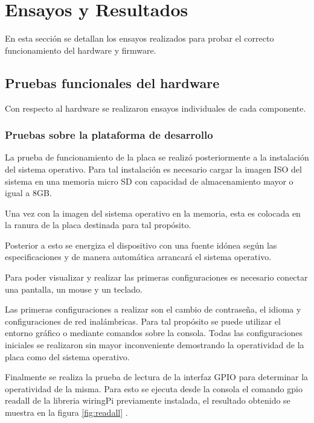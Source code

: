
\chapter{Ensayos y Resultados} %

\label{Chapter4} %
En esta sección se detallan los ensayos realizados para probar el correcto funcionamiento del hardware y firmware.

\section{Pruebas funcionales del hardware}
\label{sec:pruebasHW}

Con respecto al hardware se realizaron ensayos individuales de cada componente.
\subsection{Pruebas sobre la plataforma de desarrollo}
La prueba de funcionamiento de la placa se realizó posteriormente a la instalación del sistema operativo. Para tal instalación es necesario cargar la imagen ISO del sistema en una memoria micro SD con capacidad de almacenamiento mayor o igual a 8GB.

Una vez con la imagen del sistema operativo en la memoria, esta es colocada en la ranura de la placa destinada para tal propósito.

Posterior a esto se energiza el dispositivo con una fuente idónea según las especificaciones y de manera automática arrancará el sistema operativo.

Para poder visualizar y realizar las primeras configuraciones es necesario conectar una pantalla, un mouse y un teclado.

Las primeras configuraciones a realizar son el cambio de contraseña, el idioma y configuraciones de red inalámbricas. Para tal propósito se puede utilizar el entorno gráfico o mediante comandos sobre la consola.
Todas las configuraciones iniciales se realizaron sin mayor inconveniente demostrando la operatividad de la placa como del sistema operativo.

Finalmente se realiza la prueba de lectura de la interfaz GPIO para determinar la operatividad de la misma. Para esto se ejecuta desde la consola el comando gpio readall de la libreria wiringPi previamente instalada, el resultado obtenido se muestra en la figura \ref{fig:readall} . 

